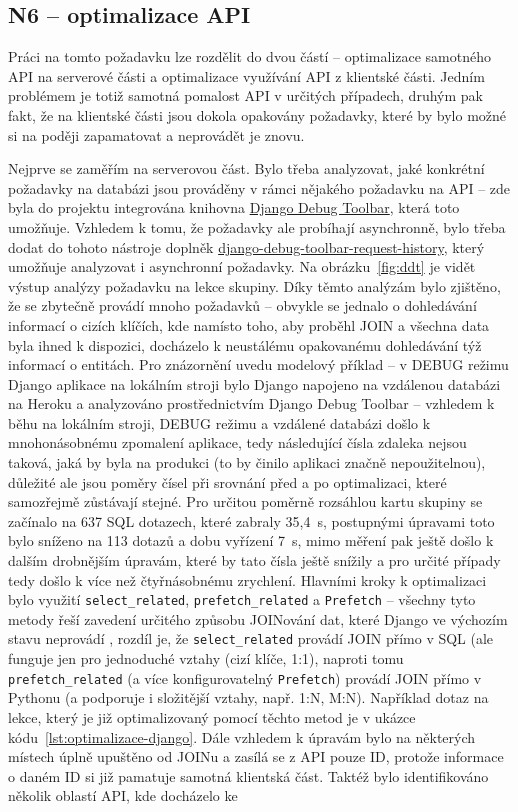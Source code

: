 \subsection{N6 -- optimalizace API}\label{N6implementace}

Práci na tomto požadavku lze rozdělit do dvou částí -- optimalizace samotného API na serverové části a optimalizace využívání API z klientské části. Jedním problémem je totiž samotná pomalost API v určitých případech, druhým pak fakt, že na klientské části jsou dokola opakovány požadavky, které by bylo možné si na poději zapamatovat a neprovádět je znovu.

Nejprve se zaměřím na serverovou část. Bylo třeba analyzovat, jaké konkrétní požadavky na databázi jsou prováděny v rámci nějakého požadavku na API -- zde byla do projektu integrována knihovna \href{https://django-debug-toolbar.readthedocs.io/en/latest/}{Django Debug Toolbar}, která toto umožňuje. Vzhledem k tomu, že požadavky ale probíhají asynchronně, bylo třeba dodat do tohoto nástroje doplněk \href{https://github.com/djsutho/django-debug-toolbar-request-history}{django-debug-toolbar-request-history}, který umožňuje analyzovat i asynchronní požadavky. Na obrázku~\ref{fig:ddt} je vidět výstup analýzy požadavku na lekce skupiny. Díky těmto analýzám bylo zjištěno, že se zbytečně provádí mnoho požadavků -- obvykle se jednalo o dohledávání informací o cizích klíčích, kde namísto toho, aby proběhl JOIN a všechna data byla ihned k dispozici, docházelo k neustálému opakovanému dohledávání týž informací o entitách. Pro znázornění uvedu modelový příklad -- v DEBUG režimu Django aplikace na lokálním stroji bylo Django napojeno na vzdálenou databázi na Heroku a analyzováno prostřednictvím Django Debug Toolbar -- vzhledem k běhu na lokálním stroji, DEBUG režimu a vzdálené databázi došlo k mnohonásobnému zpomalení aplikace, tedy následující čísla zdaleka nejsou taková, jaká by byla na produkci (to by činilo aplikaci značně nepoužitelnou), důležité ale jsou poměry čísel při srovnání před a po optimalizaci, které samozřejmě zůstávají stejné. Pro určitou poměrně rozsáhlou kartu skupiny se začínalo na 637 SQL dotazech, které zabraly 35,4~s, postupnými úpravami toto bylo sníženo na 113 dotazů a dobu vyřízení 7~s, mimo měření pak ještě došlo k dalším drobnějším úpravám, které by tato čísla ještě snížily a pro určité případy tedy došlo k více než čtyřnásobnému zrychlení. Hlavními kroky k optimalizaci bylo využití \verb|select_related|, \verb|prefetch_related| a \verb|Prefetch| -- všechny tyto metody řeší zavedení určitého způsobu JOINování dat, které Django ve výchozím stavu neprovádí \cite{django-optimalizace}, rozdíl je, že \verb|select_related| provádí JOIN přímo v SQL (ale funguje jen pro jednoduché vztahy (cizí klíče, 1:1), naproti tomu \verb|prefetch_related| (a více konfigurovatelný \verb|Prefetch|) provádí JOIN přímo v Pythonu (a podporuje i složitější vztahy, např. 1:N, M:N). Například dotaz na lekce, který je již optimalizovaný pomocí těchto metod je v ukázce kódu~\ref{lst:optimalizace-django}. Dále vzhledem k úpravám bylo na některých místech úplně upuštěno od JOINu a zasílá se z API pouze ID, protože informace o daném ID si již pamatuje samotná klientská část. Taktéž bylo identifikováno několik oblastí API, kde docházelo ke 